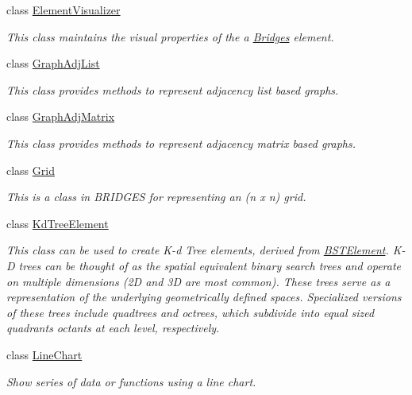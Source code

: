\begin{DoxyCompactItemize}
class \hyperlink{classbridges_1_1datastructure_1_1_element_visualizer}{Element\+Visualizer}
\begin{DoxyCompactList}\small\item\em This class maintains the visual properties of the a \hyperlink{classbridges_1_1_bridges}{Bridges} element. \end{DoxyCompactList}\item 
class \hyperlink{classbridges_1_1datastructure_1_1_graph_adj_list}{Graph\+Adj\+List}
\begin{DoxyCompactList}\small\item\em This class provides methods to represent adjacency list based graphs. \end{DoxyCompactList}\item 
class \hyperlink{classbridges_1_1datastructure_1_1_graph_adj_matrix}{Graph\+Adj\+Matrix}
\begin{DoxyCompactList}\small\item\em This class provides methods to represent adjacency matrix based graphs. \end{DoxyCompactList}\item 
class \hyperlink{classbridges_1_1datastructure_1_1_grid}{Grid}
\begin{DoxyCompactList}\small\item\em This is a class in B\+R\+I\+D\+G\+ES for representing an (n x n) grid. \end{DoxyCompactList}\item 
class \hyperlink{classbridges_1_1datastructure_1_1_kd_tree_element}{Kd\+Tree\+Element}
\begin{DoxyCompactList}\small\item\em This class can be used to create K-\/d Tree elements, derived from \hyperlink{classbridges_1_1datastructure_1_1_b_s_t_element}{B\+S\+T\+Element}. K-\/D trees can be thought of as the spatial equivalent binary search trees and operate on multiple dimensions (2D and 3D are most common). These trees serve as a representation of the underlying geometrically defined spaces. Specialized versions of these trees include quadtrees and octrees, which subdivide into equal sized quadrants octants at each level, respectively. \end{DoxyCompactList}\item 
class \hyperlink{classbridges_1_1datastructure_1_1_line_chart}{Line\+Chart}
\begin{DoxyCompactList}\small\item\em Show series of data or functions using a line chart. \end{DoxyCompactList}\item 

\end{DoxyCompactItemize}
